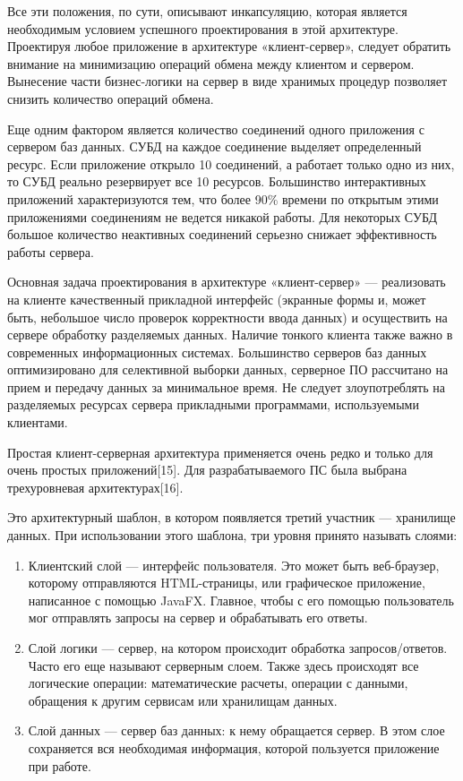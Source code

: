 Все эти положения, по сути, описывают инкапсуляцию, которая является необходимым условием успешного проектирования в этой архитектуре.
Проектируя любое приложение в архитектуре «клиент-сервер», следует обратить внимание на минимизацию операций обмена между клиентом и сервером.
Вынесение части бизнес-логики на сервер в виде хранимых процедур позволяет снизить количество операций обмена.

Еще одним фактором является количество соединений одного приложения с сервером баз данных.
СУБД на каждое соединение выделяет определенный ресурс.
Если приложение открыло 10 соединений, а работает только одно из них, то СУБД реально резервирует все 10 ресурсов.
Большинство интерактивных приложений характеризуются тем, что более 90\% времени по открытым этими приложениями соединениям не ведется никакой работы.
Для некоторых СУБД большое количество неактивных соединений серьезно снижает эффективность работы сервера.

Основная задача проектирования в архитектуре «клиент-сервер» — реализовать на клиенте качественный прикладной интерфейс (экранные формы и, может быть, небольшое число проверок корректности ввода данных) и осуществить на сервере обработку разделяемых данных.
Наличие тонкого клиента также важно в современных информационных системах.
Большинство серверов баз данных оптимизировано для селективной выборки данных, серверное ПО рассчитано на прием и передачу данных за минимальное время.
Не следует злоупотреблять на разделяемых ресурсах сервера прикладными программами, используемыми клиентами.

Простая клиент-серверная архитектура применяется очень редко и только для очень простых приложений[15].
Для разрабатываемого ПС была выбрана трехуровневая архитектурах[16].

Это архитектурный шаблон, в котором появляется третий участник — хранилище данных.
При использовании этого шаблона, три уровня принято называть слоями:
\begin{enumerate}[label=\arabic*)]
    \item Клиентский слой — интерфейс пользователя.
    Это может быть веб-браузер, которому отправляются HTML-страницы, или графическое приложение, написанное с помощью JavaFX.
    Главное, чтобы с его помощью пользователь мог отправлять запросы на сервер и обрабатывать его ответы.
    \item Слой логики — сервер, на котором происходит обработка запросов/ответов.
    Часто его еще называют серверным слоем.
    Также здесь происходят все логические операции: математические расчеты, операции с данными, обращения к другим сервисам или хранилищам данных.
    \item Слой данных — сервер баз данных: к нему обращается сервер.
    В этом слое сохраняется вся необходимая информация, которой пользуется приложение при работе.
\end{enumerate}

